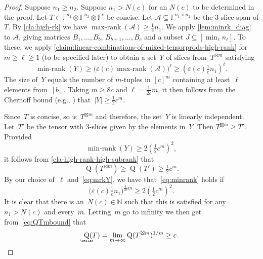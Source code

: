 \documentclass{daj}
\DeclareMathOperator{\subrank}{Q}
\DeclareMathOperator{\asympsubrank}{\underaccent{\wtilde}{Q}}
\newcommand{\FF}{\mathbb{F}}
\newcommand{\NN}{\mathbb{N}}
\newcommand{\eps}{\varepsilon}
\DeclareMathOperator{\maxrank}{max-rank}
\DeclareMathOperator{\minrank}{min-rank}
\DeclareMathOperator{\minrnk}{min-rank}
\newcommand{\beq}{\begin{equation}}
\newcommand{\eeq}{\end{equation}}
\newcommand{\beqn}{\begin{equation*}}
\newcommand{\eeqn}{\end{equation*}}
\begin{document}
\begin{proof}%
Suppose $n_1 \geq n_2$. Suppose $n_1 > N(c)$ for an $N(c)$ to be determined in the proof.
Let $T \in \FF^{n_1} \otimes \FF^{n_2} \otimes \FF^{c}$ be concise.
Let $\mathcal{A} \subseteq \FF^{n_1 \times n_2}$ be the 3-slice span of $T$.
By \autoref{cla:high-rk} we have %
$\maxrank(\mathcal{A}) \geq \frac{1}{c} n_1$.
We apply \autoref{lem:minrk_diag} to $\mathcal{A}$, giving matrices $B_1, \ldots, B_b$, $B_{b+1}, \ldots, B_c$ and a subset $J \subseteq [\min_\ell n_\ell]$.
To these, we apply \autoref{claim:linear-combinations-of-mixed-tensorprods-high-rank} for $m \geq \ell \geq 1$ (to be specified later) 
to obtain a set~$Y$ of slices from~$T^{\boxtimes m}$
satisfying
\beq\label{eq:mrkY}
\minrank(Y) \geq \big(\eps(c)\maxrank(\mathcal{A})\big)^\ell \geq (\eps(c)\tfrac1c n_1)^{\ell}. %
\eeq
The size of~$Y$ equals the number of $m$-tuples in $[c]^m$ containing at least~$\ell$ elements from~$[b]$.
Taking $m \geq 8c$ and $\ell = \tfrac{1}{2c} m$, it then follows from the Chernoff bound (e.g., \cite[Equation~(7)]{MR1045520}) that~$|Y|\geq \tfrac12c^m$.

Since~$T$ is concise, so is~$T^{\boxtimes m}$ and therefore, the set~$Y$ is linearly independent.
Let~$T'$ be the tensor with 3-slices given by the elements in~$Y$.
Then $T^{\boxtimes m} \geq T'$.
Provided
\begin{equation}\label{eq:minrank}
\minrnk(Y) \geq 2(\tfrac12c^{m})^2,
\end{equation}
it follows from \autoref{cla-high-rank-high-subrank} that
\beq\label{eq:QTmbound}
\subrank(T^{\boxtimes m}) \geq \subrank(T') \geq \tfrac12c^m.
\eeq
By our choice of~$\ell$ and~\eqref{eq:mrkY}, we have that~\eqref{eq:minrank} holds if
\beqn
\big(\eps(c)\tfrac1c n_1\big)^{\tfrac{1}{2c}m}
\geq
2(\tfrac12c^{m})^2.
\eeqn
It is clear that there is an~$N(c)\in\NN$ such that this is satisfied for any~$n_1>N(c)$ and every~$m$.
Letting~$m$ go to infinity we then get from~\eqref{eq:QTmbound} that 
\beqn
\asympsubrank(T) = \lim_{m\to \infty}\subrank(T^{\boxtimes m})^{1/m} \geq c.\qedhere
\eeqn
\end{proof}
\end{document}
